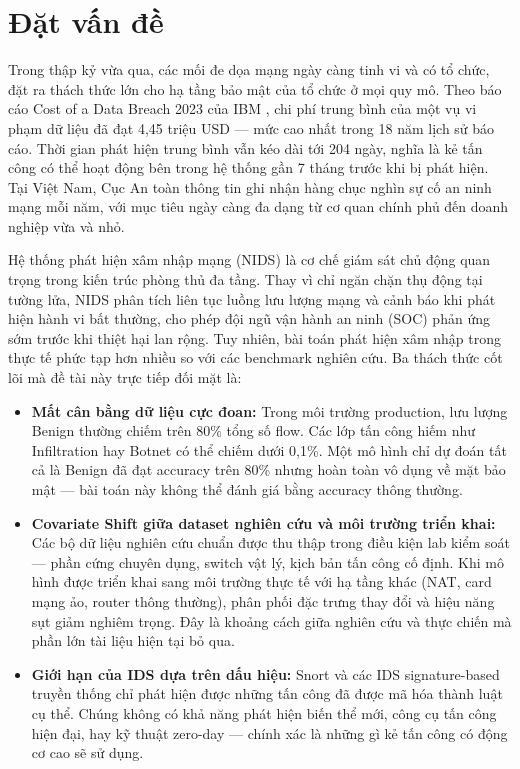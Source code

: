 \documentclass[../DoAn.tex]{subfiles}
\begin{document}
\section{Đặt vấn đề}
\label{sec:dvd}

Trong thập kỷ vừa qua, các mối đe dọa mạng ngày càng tinh vi và có tổ chức, đặt ra thách thức lớn cho hạ tầng bảo mật của tổ chức ở mọi quy mô. Theo báo cáo Cost of a Data Breach 2023 của IBM \cite{ibm2023}, chi phí trung bình của một vụ vi phạm dữ liệu đã đạt 4,45 triệu USD --- mức cao nhất trong 18 năm lịch sử báo cáo. Thời gian phát hiện trung bình vẫn kéo dài tới 204 ngày, nghĩa là kẻ tấn công có thể hoạt động bên trong hệ thống gần 7 tháng trước khi bị phát hiện. Tại Việt Nam, Cục An toàn thông tin ghi nhận hàng chục nghìn sự cố an ninh mạng mỗi năm, với mục tiêu ngày càng đa dạng từ cơ quan chính phủ đến doanh nghiệp vừa và nhỏ.

Hệ thống phát hiện xâm nhập mạng (NIDS) là cơ chế giám sát chủ động quan trọng trong kiến trúc phòng thủ đa tầng. Thay vì chỉ ngăn chặn thụ động tại tường lửa, NIDS phân tích liên tục luồng lưu lượng mạng và cảnh báo khi phát hiện hành vi bất thường, cho phép đội ngũ vận hành an ninh (SOC) phản ứng sớm trước khi thiệt hại lan rộng. Tuy nhiên, bài toán phát hiện xâm nhập trong thực tế phức tạp hơn nhiều so với các benchmark nghiên cứu. Ba thách thức cốt lõi mà đề tài này trực tiếp đối mặt là:

\begin{itemize}
    \item \textbf{Mất cân bằng dữ liệu cực đoan:} Trong môi trường production, lưu lượng Benign thường chiếm trên 80\% tổng số flow. Các lớp tấn công hiếm như Infiltration hay Botnet có thể chiếm dưới 0,1\%. Một mô hình chỉ dự đoán tất cả là Benign đã đạt accuracy trên 80\% nhưng hoàn toàn vô dụng về mặt bảo mật --- bài toán này không thể đánh giá bằng accuracy thông thường.

    \item \textbf{Covariate Shift giữa dataset nghiên cứu và môi trường triển khai:} Các bộ dữ liệu nghiên cứu chuẩn được thu thập trong điều kiện lab kiểm soát --- phần cứng chuyên dụng, switch vật lý, kịch bản tấn công cố định. Khi mô hình được triển khai sang môi trường thực tế với hạ tầng khác (NAT, card mạng ảo, router thông thường), phân phối đặc trưng thay đổi và hiệu năng sụt giảm nghiêm trọng. Đây là khoảng cách giữa nghiên cứu và thực chiến mà phần lớn tài liệu hiện tại bỏ qua.

    \item \textbf{Giới hạn của IDS dựa trên dấu hiệu:} Snort và các IDS signature-based truyền thống chỉ phát hiện được những tấn công đã được mã hóa thành luật cụ thể. Chúng không có khả năng phát hiện biến thể mới, công cụ tấn công hiện đại, hay kỹ thuật zero-day --- chính xác là những gì kẻ tấn công có động cơ cao sẽ sử dụng.
\end{itemize}
\end{document}
